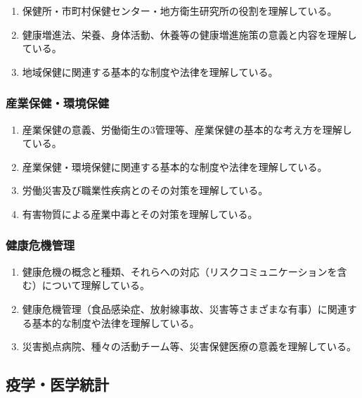 \documentclass[
]{ltjsarticle}
\providecommand{\tightlist}{%
  \setlength{\itemsep}{0pt}\setlength{\parskip}{0pt}}
\begin{document}
\begin{enumerate}
\def\labelenumi{\arabic{enumi}.}
\tightlist
\item
  保健所・市町村保健センター・地方衛生研究所の役割を理解している。
\item
  健康増進法、栄養、身体活動、休養等の健康増進施策の意義と内容を理解している。
\item
  地域保健に関連する基本的な制度や法律を理解している。
\end{enumerate}

\hypertarget{ux7523ux696dux4fddux5065ux74b0ux5883ux4fddux5065}{%
\subsubsection{産業保健・環境保健}\label{ux7523ux696dux4fddux5065ux74b0ux5883ux4fddux5065}}

\begin{enumerate}
\def\labelenumi{\arabic{enumi}.}
\tightlist
\item
  産業保健の意義、労働衛生の3管理等、産業保健の基本的な考え方を理解している。
\item
  産業保健・環境保健に関連する基本的な制度や法律を理解している。
\item
  労働災害及び職業性疾病とのその対策を理解している。
\item
  有害物質による産業中毒とその対策を理解している。
\end{enumerate}

\hypertarget{ux5065ux5eb7ux5371ux6a5fux7ba1ux7406}{%
\subsubsection{健康危機管理}\label{ux5065ux5eb7ux5371ux6a5fux7ba1ux7406}}

\begin{enumerate}
\def\labelenumi{\arabic{enumi}.}
\tightlist
\item
  健康危機の概念と種類、それらへの対応（リスクコミュニケーションを含む）について理解している。
\item
  健康危機管理（食品感染症、放射線事故、災害等さまざまな有事）に関連する基本的な制度や法律を理解している。
\item
  災害拠点病院、種々の活動チーム等、災害保健医療の意義を理解している。
\end{enumerate}

\hypertarget{ux75abux5b66ux533bux5b66ux7d71ux8a08}{%
\subsection{疫学・医学統計}\label{ux75abux5b66ux533bux5b66ux7d71ux8a08}}
\end{document}
